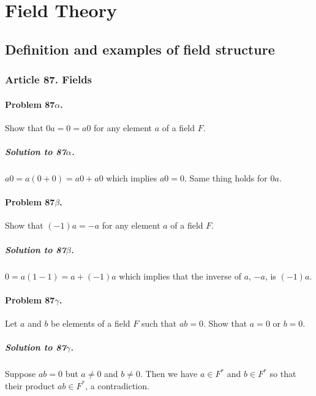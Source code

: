 \chapter{Field Theory}

\section{Definition and examples of field structure}


\subsection{Article 87. Fields}

\subsubsection{Problem 87$\alpha$.}
Show that $0a = 0 = a0$ for any element $a$ of a field $F$.

\paragraph*{Solution to 87$\alpha$.}
$a0 = a (0 + 0) = a0 + a0$ which implies $a0 = 0$. Same thing holds for $0a$.

\subsubsection{Problem 87$\beta$.}
Show that $(-1)a = -a$ for any element $a$ of a field $F$.

\paragraph*{Solution to 87$\beta$.}
$0 = a(1-1) = a + (-1)a$ which implies that the inverse of $a$, $-a$, is
$(-1)a$.

\subsubsection{Problem 87$\gamma$.}
Let $a$ and $b$ be elements of a field $F$ such that $ab = 0$. Show that
$a=0$ or $b=0$.

\paragraph*{Solution to 87$\gamma$.}
Suppose $ab = 0$ but $a \neq 0$ and $b \neq 0$. Then we have $ a \in F^*$ and
$ b \in F^*$ so that their product $ab \in F^*$, a contradiction.

